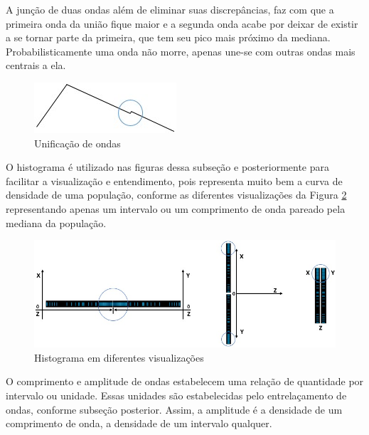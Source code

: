 A junção de duas ondas além de eliminar suas discrepâncias, faz com que a primeira onda da união fique maior e a segunda onda acabe por deixar de existir a se tornar parte da primeira, que tem seu pico mais próximo da mediana. Probabilisticamente uma onda não morre, apenas une-se com outras ondas mais centrais a ela.
	\begin{figure}[H]
	\caption{Unificação de ondas}
	\label{fig:consciousness_uniform_wave}
	\centering
	\includegraphics[scale=1]{sections/images/consciousness_uniform_wave.jpg}
	\end{figure}

O histograma é utilizado nas figuras dessa subseção e posteriormente para facilitar a visualização e entendimento, pois representa muito bem a curva de densidade de uma população, conforme as diferentes visualizações da Figura \ref{fig:consciousness_wave_histogram} representando apenas um intervalo ou um comprimento de onda pareado pela mediana da população.  
	\begin{figure}[H]
	\caption{Histograma em diferentes visualizações }
	\label{fig:consciousness_wave_histogram}
	\centering
	\includegraphics[scale=.7]{sections/images/consciousness_wave_histogram.jpg}
	\end{figure}
O comprimento e amplitude de ondas estabelecem uma relação de quantidade por intervalo ou unidade. Essas unidades são estabelecidas pelo entrelaçamento de ondas, conforme subseção posterior. Assim, a amplitude é a densidade de um comprimento de onda, a densidade de um intervalo qualquer.  

